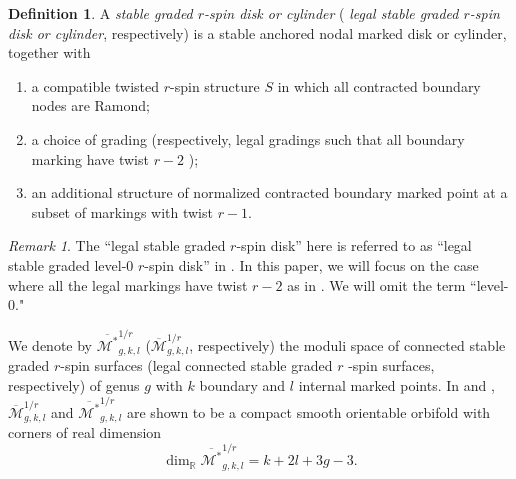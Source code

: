 \documentclass[11pt]{amsart}
\theoremstyle{definition}
\newtheorem{definition}[dummy]{Definition}
\theoremstyle{remark}
\newtheorem{rmk}[dummy]{Remark}
\newcommand{\<}{\left<}
\renewcommand{\>}{\right>}
\numberwithin{equation}{section}
\def\Mbar{{\overline{\mathcal M}}}
\def\Mbarstar{{\overline{\mathcal M^*}}}
\begin{document}
\begin{definition}
\label{def graded rspin disk}
A %
\textit{stable graded $r$-spin disk or cylinder} ( \textit{legal stable graded $r$-spin disk or cylinder}, respectively) is %
a stable anchored nodal marked disk or cylinder, together with
\begin{enumerate}
\item a compatible twisted $r$-spin structure $S$ in which all contracted boundary nodes are Ramond;
\item a choice of grading (respectively, legal gradings such that all boundary marking have twist $r-2$ );

\item  an additional structure of normalized contracted boundary marked point at a subset of markings with twist $r-1$.

\end{enumerate}
\end{definition}

\begin{rmk}
   The ``legal stable graded $r$-spin disk'' here is referred to as ``legal stable graded level-$0$ $r$-spin disk'' in \cite{TZ1,TZ2}. In %
this paper, we %
will focus on the case where all the legal markings have twist $r-2$ as in \cite{BCT2}. We will omit the term %
``level-$0$."
\end{rmk}





We %
denote by $\Mbarstar_{g,k,l}^{1/r}$ %
($\Mbar_{g,k,l}^{1/r}$, respectively) the %
moduli space of connected stable graded $r$-spin surfaces (legal connected stable graded $r$%
-spin surfaces, respectively) %
of genus $g$ with $k$ boundary and $l$ internal marked points. In \cite[Theorem 3.4]{BCT1} and \cite[Theorem 2.8]{TZ1}, $\Mbar_{g,k,l}^{1/r}$ and $\Mbarstar_{g,k,l}^{1/r}$ are shown to be a compact smooth orientable orbifold %
with corners of %
real dimension 
\begin{equation}\label{eq dim of moduli}
\dim_{\mathbb R} \Mbarstar_{g,k,l}^{1/r}=k+2l+3g-3.
\end{equation}
\end{document}
